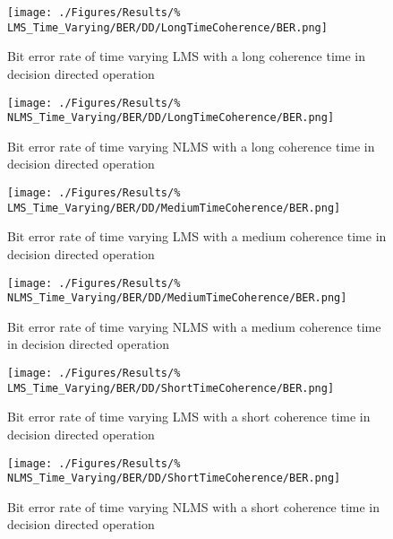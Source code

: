 \begin{figure}[ht]
	\centering
	\begin{minipage}{0.49\textwidth}
		\centering
		\texttt{[image: ./Figures/Results/\%
	LMS\_Time\_Varying/BER/DD/LongTimeCoherence/BER.png]}
		\caption{Bit error rate of time varying LMS with a 
		long coherence time in decision directed 
		operation}
	\end{minipage}
	\begin{minipage}{0.49\textwidth}
		\centering
		\texttt{[image: ./Figures/Results/\%
	NLMS\_Time\_Varying/BER/DD/LongTimeCoherence/BER.png]}
		\caption{Bit error rate of time varying NLMS with a 
		long coherence time in decision directed 
		operation}
		\label{fig:NLMS-BER-Long-DD-TV}
	\end{minipage}
\end{figure}

\begin{figure}[ht]
	\centering
	\begin{minipage}{0.49\textwidth}
		\centering
		\texttt{[image: ./Figures/Results/\%
	LMS\_Time\_Varying/BER/DD/MediumTimeCoherence/BER.png]}
		\caption{Bit error rate of time varying LMS with a 
		medium coherence time in decision directed 
		operation}
	\end{minipage}
	\begin{minipage}{0.49\textwidth}
		\centering
		\texttt{[image: ./Figures/Results/\%
	NLMS\_Time\_Varying/BER/DD/MediumTimeCoherence/BER.png]}
		\caption{Bit error rate of time varying NLMS with a 
		medium coherence time in decision directed operation}
	\end{minipage}
\end{figure}

\begin{figure}[ht]
	\centering
	\begin{minipage}{0.49\textwidth}
		\centering
		\texttt{[image: ./Figures/Results/\%
	LMS\_Time\_Varying/BER/DD/ShortTimeCoherence/BER.png]}
		\caption{Bit error rate of time varying LMS with a 
		short coherence time in decision directed operation}
	\end{minipage}
	\begin{minipage}{0.49\textwidth}
		\centering
		\texttt{[image: ./Figures/Results/\%
	NLMS\_Time\_Varying/BER/DD/ShortTimeCoherence/BER.png]}
		\caption{Bit error rate of time varying NLMS with a 
		short coherence time in decision directed operation}
	\end{minipage}
\end{figure}


